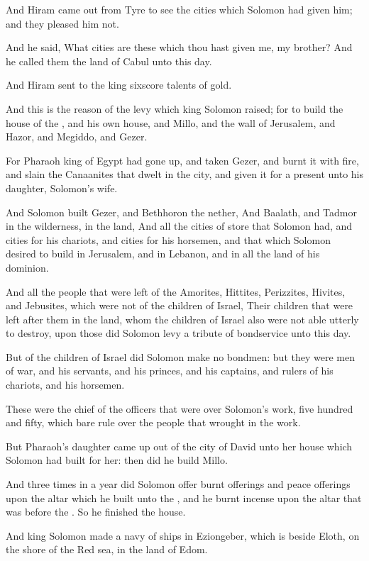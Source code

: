 \Verse And Hiram came out from Tyre to see the cities which Solomon had given him; and they pleased him not.

\Verse And he said, What cities are these which thou hast given me, my brother? And he called them the land of Cabul unto this day.

\Verse And Hiram sent to the king sixscore talents of gold.

\Verse And this is the reason of the levy which king Solomon raised; for to build the house of the \LORD, and his own house, and Millo, and the wall of Jerusalem, and Hazor, and Megiddo, and Gezer.

\Verse For Pharaoh king of Egypt had gone up, and taken Gezer, and burnt it with fire, and slain the Canaanites that dwelt in the city, and given it for a present unto his daughter, Solomon's wife.

\Verse And Solomon built Gezer, and Bethhoron the nether, \Verse And Baalath, and Tadmor in the wilderness, in the land, \Verse And all the cities of store that Solomon had, and cities for his chariots, and cities for his horsemen, and that which Solomon desired to build in Jerusalem, and in Lebanon, and in all the land of his dominion.

\Verse And all the people that were left of the Amorites, Hittites, Perizzites, Hivites, and Jebusites, which were not of the children of Israel, \Verse Their children that were left after them in the land, whom the children of Israel also were not able utterly to destroy, upon those did Solomon levy a tribute of bondservice unto this day.

\Verse But of the children of Israel did Solomon make no bondmen: but they were men of war, and his servants, and his princes, and his captains, and rulers of his chariots, and his horsemen.

\Verse These were the chief of the officers that were over Solomon's work, five hundred and fifty, which bare rule over the people that wrought in the work.

\Verse But Pharaoh's daughter came up out of the city of David unto her house which Solomon had built for her: then did he build Millo.

\Verse And three times in a year did Solomon offer burnt offerings and peace offerings upon the altar which he built unto the \LORD, and he burnt incense upon the altar that was before the \LORD. So he finished the house.

\Verse And king Solomon made a navy of ships in Eziongeber, which is beside Eloth, on the shore of the Red sea, in the land of Edom.

